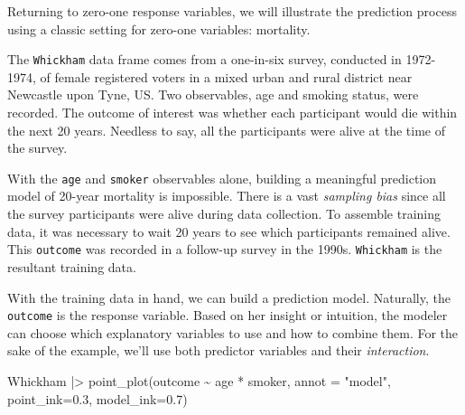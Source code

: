 \documentclass[
  letterpaper,
  DIV=11,
  numbers=noendperiod,
  oneside]{scrartcl}
\newenvironment{Shaded}{\begin{snugshade}}{\end{snugshade}}
\newcommand{\AttributeTok}[1]{\textcolor[rgb]{0.40,0.45,0.13}{#1}}
\newcommand{\FloatTok}[1]{\textcolor[rgb]{0.68,0.00,0.00}{#1}}
\newcommand{\FunctionTok}[1]{\textcolor[rgb]{0.28,0.35,0.67}{#1}}
\newcommand{\NormalTok}[1]{\textcolor[rgb]{0.00,0.23,0.31}{#1}}
\newcommand{\SpecialCharTok}[1]{\textcolor[rgb]{0.37,0.37,0.37}{#1}}
\newcommand{\StringTok}[1]{\textcolor[rgb]{0.13,0.47,0.30}{#1}}
\begin{document}
Returning to zero-one response variables, we will illustrate the
prediction process using a classic setting for zero-one variables:
mortality.

The \texttt{Whickham} data frame comes from a one-in-six survey,
conducted in 1972-1974, of female registered voters in a mixed urban and
rural district near Newcastle upon Tyne, US. Two observables, age and
smoking status, were recorded. The outcome of interest was whether each
participant would die within the next 20 years. Needless to say, all the
participants were alive at the time of the survey.

\begin{table}

\caption{\label{tbl-whickham-training}A few cases from the
\texttt{Whickham} training data.}


\end{table}%

With the \texttt{age} and \texttt{smoker} observables alone, building a
meaningful prediction model of 20-year mortality is impossible. There is
a vast \emph{sampling bias} since all the survey participants were alive
during data collection. To assemble training data, it was necessary to
wait 20 years to see which participants remained alive. This
\texttt{outcome} was recorded in a follow-up survey in the 1990s.
\texttt{Whickham} is the resultant training data.

With the training data in hand, we can build a prediction model.
Naturally, the \texttt{outcome} is the response variable. Based on her
insight or intuition, the modeler can choose which explanatory variables
to use and how to combine them. For the sake of the example, we'll use
both predictor variables and their \emph{interaction}.

\begin{Shaded}
\begin{Highlighting}[]
\NormalTok{Whickham }\SpecialCharTok{|\textgreater{}} 
  \FunctionTok{point\_plot}\NormalTok{(outcome }\SpecialCharTok{\textasciitilde{}}\NormalTok{ age }\SpecialCharTok{*}\NormalTok{ smoker, }\AttributeTok{annot =} \StringTok{"model"}\NormalTok{, }
             \AttributeTok{point\_ink=}\FloatTok{0.3}\NormalTok{, }\AttributeTok{model\_ink=}\FloatTok{0.7}\NormalTok{) }
\end{Highlighting}
\end{Shaded}
\end{document}
